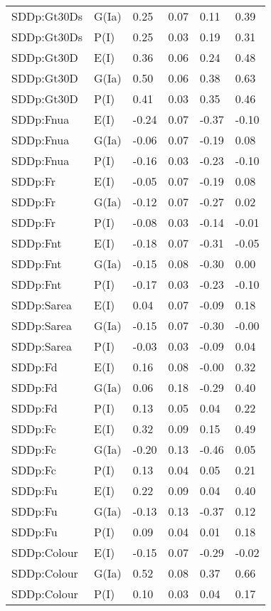 \begin{center}
\begin{longtable}{|p{1.1in}|p{0.7in}|p{0.7in}|p{0.6in}|p{0.6in}|p{0.6in}|}
  SDDp:Gt30Ds & G(Ia) & 0.25 & 0.07 & 0.11 & 0.39 \\ 
  SDDp:Gt30Ds & P(I) & 0.25 & 0.03 & 0.19 & 0.31 \\ 
  SDDp:Gt30D & E(I) & 0.36 & 0.06 & 0.24 & 0.48 \\ 
  SDDp:Gt30D & G(Ia) & 0.50 & 0.06 & 0.38 & 0.63 \\ 
  SDDp:Gt30D & P(I) & 0.41 & 0.03 & 0.35 & 0.46 \\ 
  SDDp:Fnua & E(I) & -0.24 & 0.07 & -0.37 & -0.10 \\ 
  SDDp:Fnua & G(Ia) & -0.06 & 0.07 & -0.19 & 0.08 \\ 
  SDDp:Fnua & P(I) & -0.16 & 0.03 & -0.23 & -0.10 \\ 
  SDDp:Fr & E(I) & -0.05 & 0.07 & -0.19 & 0.08 \\ 
  SDDp:Fr & G(Ia) & -0.12 & 0.07 & -0.27 & 0.02 \\ 
  SDDp:Fr & P(I) & -0.08 & 0.03 & -0.14 & -0.01 \\ 
  SDDp:Fnt & E(I) & -0.18 & 0.07 & -0.31 & -0.05 \\ 
  SDDp:Fnt & G(Ia) & -0.15 & 0.08 & -0.30 & 0.00 \\ 
  SDDp:Fnt & P(I) & -0.17 & 0.03 & -0.23 & -0.10 \\ 
  SDDp:Sarea & E(I) & 0.04 & 0.07 & -0.09 & 0.18 \\ 
  SDDp:Sarea & G(Ia) & -0.15 & 0.07 & -0.30 & -0.00 \\ 
  SDDp:Sarea & P(I) & -0.03 & 0.03 & -0.09 & 0.04 \\ 
  SDDp:Fd & E(I) & 0.16 & 0.08 & -0.00 & 0.32 \\ 
  SDDp:Fd & G(Ia) & 0.06 & 0.18 & -0.29 & 0.40 \\ 
  SDDp:Fd & P(I) & 0.13 & 0.05 & 0.04 & 0.22 \\ 
  SDDp:Fc & E(I) & 0.32 & 0.09 & 0.15 & 0.49 \\ 
  SDDp:Fc & G(Ia) & -0.20 & 0.13 & -0.46 & 0.05 \\ 
  SDDp:Fc & P(I) & 0.13 & 0.04 & 0.05 & 0.21 \\ 
  SDDp:Fu & E(I) & 0.22 & 0.09 & 0.04 & 0.40 \\ 
  SDDp:Fu & G(Ia) & -0.13 & 0.13 & -0.37 & 0.12 \\ 
  SDDp:Fu & P(I) & 0.09 & 0.04 & 0.01 & 0.18 \\ 
  SDDp:Colour & E(I) & -0.15 & 0.07 & -0.29 & -0.02 \\ 
  SDDp:Colour & G(Ia) & 0.52 & 0.08 & 0.37 & 0.66 \\ 
  SDDp:Colour & P(I) & 0.10 & 0.03 & 0.04 & 0.17 \\ 

\end{longtable}
\end{center}
